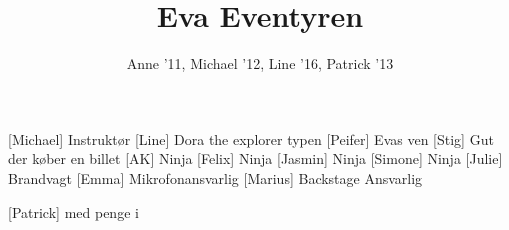 \documentclass[a4paper,11pt]{article}
\title{Eva Eventyren}
\author{Anne '11, Michael '12, Line '16, Patrick '13}
\begin{document}
\maketitle

\begin{roles}
[Michael] Instruktør
[Line] Dora the explorer typen
[Peifer] Evas ven
[Stig] Gut der køber en billet
[AK] Ninja
[Felix] Ninja
[Jasmin] Ninja
[Simone] Ninja
[Julie] Brandvagt
[Emma] Mikrofonansvarlig
[Marius] Backstage Ansvarlig
\end{roles}

\begin{props}
[Patrick]
 med penge i
\end{props}
\end{document}
